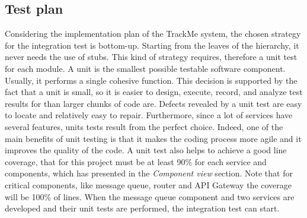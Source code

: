 \subsection{Test plan}
Considering the implementation plan of the TrackMe system, the chosen strategy for the integration test is bottom-up. Starting from the leaves of the hierarchy, it never needs the use of stubs. This kind of strategy requires, therefore a unit test for each module. A unit is the smallest possible testable software component. Usually, it performs a single cohesive function. This decision is supported by the fact that a unit is small, so it is easier to design, execute, record, and analyze test results for than larger chunks of code are. Defects revealed by a unit test are easy to locate and relatively easy to repair. Furthermore, since a lot of services have several features, units tests result from the perfect choice. Indeed, one of the main benefits of unit testing is that it makes the coding process more agile and it improves the quality of the code. A unit test also helps to achieve a good line coverage, that for this project must be at least 90\% for each service and components, which has presented in the \textit{Component view} section. Note that for critical components, like message queue, router and API Gateway the coverage will be 100\% of lines. When the message queue component and two services are developed and their unit tests are performed, the integration test can start. 
